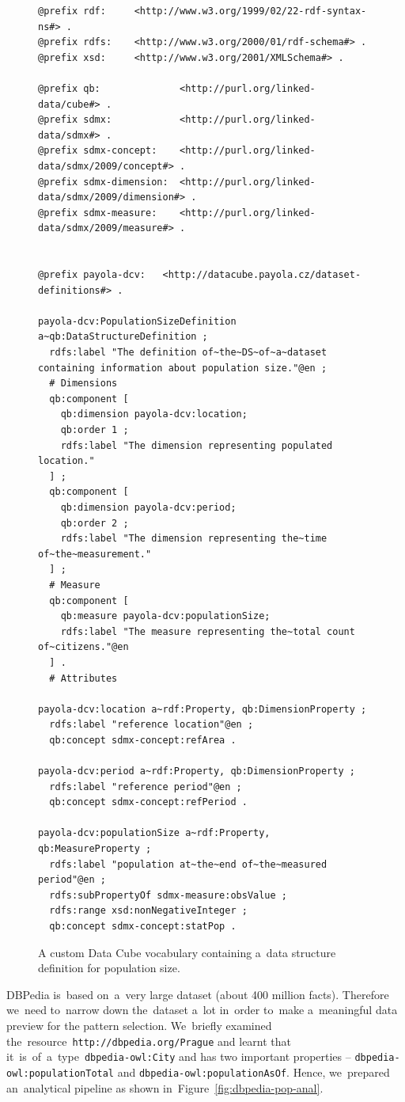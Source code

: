\begin{figure}
  \scriptsize
  \begin{verbatim}
@prefix rdf:     <http://www.w3.org/1999/02/22-rdf-syntax-ns#> .
@prefix rdfs:    <http://www.w3.org/2000/01/rdf-schema#> .
@prefix xsd:     <http://www.w3.org/2001/XMLSchema#> .

@prefix qb:              <http://purl.org/linked-data/cube#> .
@prefix sdmx:            <http://purl.org/linked-data/sdmx#> .
@prefix sdmx-concept:    <http://purl.org/linked-data/sdmx/2009/concept#> .
@prefix sdmx-dimension:  <http://purl.org/linked-data/sdmx/2009/dimension#> .
@prefix sdmx-measure:    <http://purl.org/linked-data/sdmx/2009/measure#> .


@prefix payola-dcv:   <http://datacube.payola.cz/dataset-definitions#> .

payola-dcv:PopulationSizeDefinition a~qb:DataStructureDefinition ;
  rdfs:label "The definition of~the~DS~of~a~dataset containing information about population size."@en ;
  # Dimensions
  qb:component [
    qb:dimension payola-dcv:location;
    qb:order 1 ;
    rdfs:label "The dimension representing populated location."
  ] ;
  qb:component [	
    qb:dimension payola-dcv:period;
    qb:order 2 ;
    rdfs:label "The dimension representing the~time of~the~measurement."
  ] ;
  # Measure
  qb:component [
    qb:measure payola-dcv:populationSize;
    rdfs:label "The measure representing the~total count of~citizens."@en
  ] .
  # Attributes

payola-dcv:location a~rdf:Property, qb:DimensionProperty ;
  rdfs:label "reference location"@en ;
  qb:concept sdmx-concept:refArea .

payola-dcv:period a~rdf:Property, qb:DimensionProperty ;
  rdfs:label "reference period"@en ;
  qb:concept sdmx-concept:refPeriod .

payola-dcv:populationSize a~rdf:Property, qb:MeasureProperty ;
  rdfs:label "population at~the~end of~the~measured period"@en ;
  rdfs:subPropertyOf sdmx-measure:obsValue ;
  rdfs:range xsd:nonNegativeInteger ;
  qb:concept sdmx-concept:statPop .
  \end{verbatim}
  \caption{A custom Data Cube vocabulary containing a~data structure definition for population size.}
  \label{fig:dcv-dbpedia-dsd}
\end{figure}

\begin{sloppypar}
DBPedia is~based on~a~very large dataset (about 400 million facts). Therefore we~need to~narrow down the~dataset a~lot in~order to~make a~meaningful data preview for 
the
pattern selection. We~briefly examined the~resource~\texttt{http://dbpedia.org/Prague} 
and learnt that it~is~of~a~type~\texttt{dbpedia-owl:City} and has two 
important properties -- \texttt{dbpedia-owl:populationTotal} and 
\texttt{dbpedia-owl:populationAsOf}. Hence, we~prepared an~analytical pipeline 
as shown in~Figure~\ref{fig:dbpedia-pop-anal}.
\end{sloppypar}

